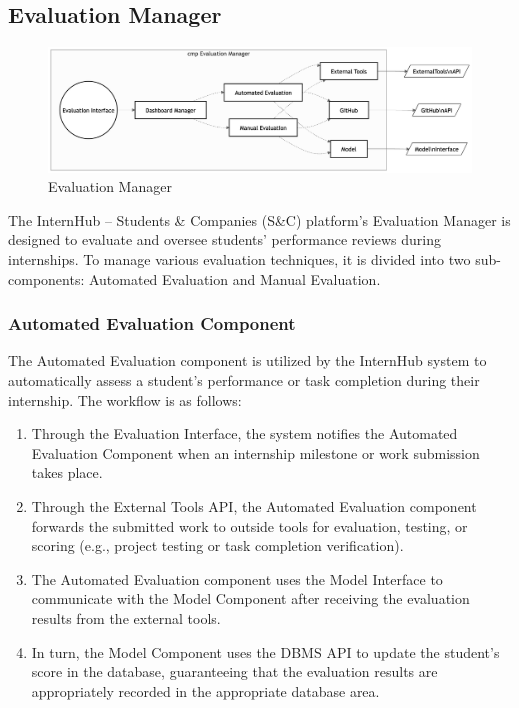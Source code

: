 \subsection{Evaluation Manager}
\label{subsubsec:evaluation_manager}
\begin{figure}[H]
    \begin{center}
        \includegraphics[width=0.82\linewidth]{JhaBhatiaSharma/imagesDD/EvaluationManager.png}
        \caption{Evaluation Manager}
        \label{fig:evaluationmanager}%
    \end{center}
\end{figure}
The InternHub – Students \& Companies (S\&C) platform's Evaluation Manager is designed to evaluate and oversee students' performance reviews during internships. To manage various evaluation techniques, it is divided into two sub-components: Automated Evaluation and Manual Evaluation.

\subsubsection{Automated Evaluation Component}
The Automated Evaluation component is utilized by the InternHub system to automatically assess a student’s performance or task completion during their internship. The workflow is as follows:
\begin{enumerate}
    \item Through the Evaluation Interface, the system notifies the Automated Evaluation Component when an internship milestone or work submission takes place.
    \item Through the External Tools API, the Automated Evaluation component forwards the submitted work to outside tools for evaluation, testing, or scoring (e.g., project testing or task completion verification).
    \item The Automated Evaluation component uses the Model Interface to communicate with the Model Component after receiving the evaluation results from the external tools.
    \item In turn, the Model Component uses the DBMS API to update the student's score in the database, guaranteeing that the evaluation results are appropriately recorded in the appropriate database area.
\end{enumerate}


